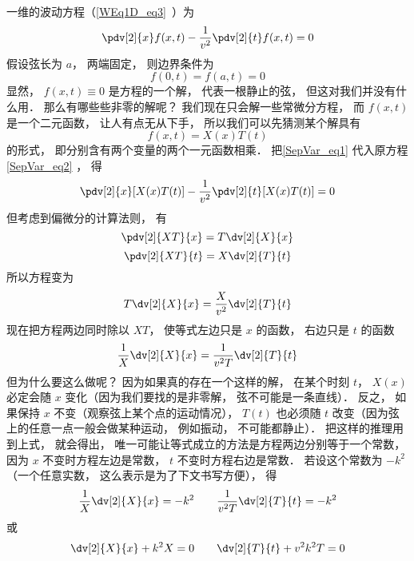 一维的波动方程（\autoref{WEq1D_eq3}~）为
\begin{equation}
\pdv[2]{x} f(x, t) - \frac{1}{v^2} \pdv[2]{t}f(x, t) = 0
\end{equation}
假设弦长为 $a$， 两端固定， 则边界条件为
\begin{equation}\label{SepVar_eq3}
f(0, t) = f(a, t) = 0
\end{equation}
显然， $f(x, t) \equiv 0$ 是方程的一个解， 代表一根静止的弦， 但这对我们并没有什么用． 那么有哪些些非零的解呢？ 我们现在只会解一些常微分方程， 而 $f(x, t)$ 是一个二元函数， 让人有点无从下手， 所以我们可以先猜测某个解具有
\begin{equation}\label{SepVar_eq1}
f(x, t) = X(x) T(t)
\end{equation}
的形式， 即分别含有两个变量的两个一元函数相乘． 把\autoref{SepVar_eq1} 代入原方程\autoref{SepVar_eq2} ， 得
\begin{equation}
\pdv[2]{x}[X(x)T(t)] - \frac{1}{v^2}\pdv[2]{t} [X(x) T(t)] = 0
\end{equation}
但考虑到偏微分的计算法则， 有
\begin{equation}
\pdv[2]{XT}{x} = T \dv[2]{X}{x}
\end{equation}
\begin{equation}
\pdv[2]{XT}{t} = X \dv[2]{T}{t}
\end{equation}
所以方程变为
\begin{equation}
T\dv[2]{X}{x} = \frac{X}{v^2} \dv[2]{T}{t}
\end{equation}
现在把方程两边同时除以 $XT$， 使等式左边只是 $x$ 的函数， 右边只是 $t$ 的函数
\begin{equation}
\frac{1}{X}\dv[2]{X}{x} = \frac{1}{v^2 T} \dv[2]{T}{t}
\end{equation}
但为什么要这么做呢？ 因为如果真的存在一个这样的解， 在某个时刻 $t$， $X(x)$ 必定会随 $x$ 变化（因为我们要找的是非零解， 弦不可能是一条直线）． 反之， 如果保持 $x$ 不变（观察弦上某个点的运动情况）， $T(t)$ 也必须随 $t$ 改变（因为弦上的任意一点一般会做某种运动， 例如振动， 不可能都静止）． 把这样的推理用到上式， 就会得出， 唯一可能让等式成立的方法是方程两边分别等于一个常数， 因为 $x$ 不变时方程左边是常数，  $t$ 不变时方程右边是常数． 若设这个常数为 $-k^2$（一个任意实数， 这么表示是为了下文书写方便）， 得
\begin{equation}
\frac{1}{X}\dv[2]{X}{x} = -k^2
\qquad
\frac{1}{v^2 T}\dv[2]{T}{t} = -k^2
\end{equation}
或
\begin{equation}
\dv[2]{X}{x} + k^2 X = 0
\qquad
\dv[2]{T}{t} + v^2k^2 T = 0
\end{equation}

